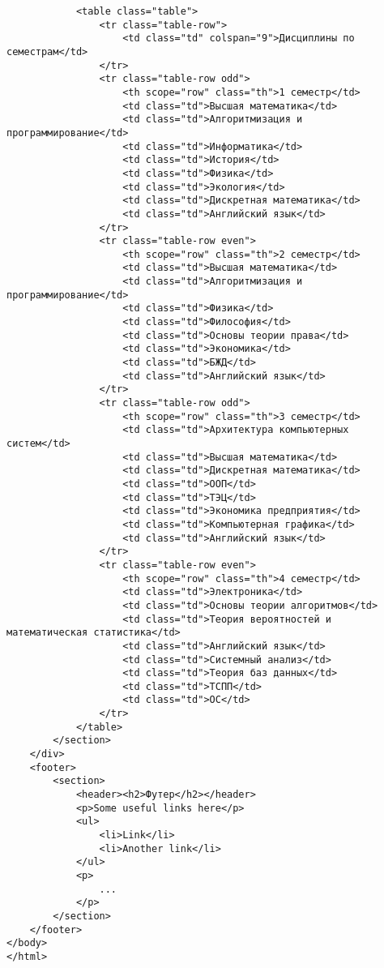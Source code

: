 \begin{lstlisting}
            <table class="table">
                <tr class="table-row">
                    <td class="td" colspan="9">Дисциплины по семестрам</td>
                </tr>
                <tr class="table-row odd">
                    <th scope="row" class="th">1 семестр</td>
                    <td class="td">Высшая математика</td>
                    <td class="td">Алгоритмизация и программирование</td>
                    <td class="td">Информатика</td>
                    <td class="td">История</td>
                    <td class="td">Физика</td>
                    <td class="td">Экология</td>
                    <td class="td">Дискретная математика</td>
                    <td class="td">Английский язык</td>
                </tr>
                <tr class="table-row even">
                    <th scope="row" class="th">2 семестр</td>
                    <td class="td">Высшая математика</td>
                    <td class="td">Алгоритмизация и программирование</td>
                    <td class="td">Физика</td>
                    <td class="td">Философия</td>
                    <td class="td">Основы теории права</td>
                    <td class="td">Экономика</td>
                    <td class="td">БЖД</td>
                    <td class="td">Английский язык</td>
                </tr>
                <tr class="table-row odd">
                    <th scope="row" class="th">3 семестр</td>
                    <td class="td">Архитектура компьютерных систем</td>
                    <td class="td">Высшая математика</td>
                    <td class="td">Дискретная математика</td>
                    <td class="td">ООП</td>
                    <td class="td">ТЭЦ</td>
                    <td class="td">Экономика предприятия</td>
                    <td class="td">Компьютерная графика</td>
                    <td class="td">Английский язык</td>
                </tr>
                <tr class="table-row even">
                    <th scope="row" class="th">4 семестр</td>
                    <td class="td">Электроника</td>
                    <td class="td">Основы теории алгоритмов</td>
                    <td class="td">Теория вероятностей и математическая статистика</td>
                    <td class="td">Английский язык</td>
                    <td class="td">Системный анализ</td>
                    <td class="td">Теория баз данных</td>
                    <td class="td">ТСПП</td>
                    <td class="td">ОС</td>
                </tr>
            </table>
        </section>
    </div>
    <footer>
        <section>
            <header><h2>Футер</h2></header>
            <p>Some useful links here</p>
            <ul>
                <li>Link</li>
                <li>Another link</li>
            </ul>
            <p>
                ... 
            </p>
        </section>
    </footer>
</body>
</html>
\end{lstlisting}

